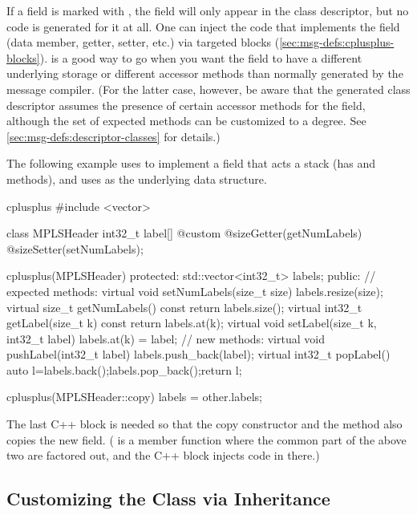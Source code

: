 If a field is marked with , the field will only appear in the
class descriptor, but no code is generated for it at all. One can inject the
code that implements the field (data member, getter, setter, etc.) via targeted
 blocks (\ref{sec:msg-defs:cplusplus-blocks}).
 is a good way to go when you want the field to have a different
underlying storage or different accessor methods than normally generated by the
message compiler. (For the latter case, however, be aware that the generated
class descriptor assumes the presence of certain accessor methods for the
field, although the set of expected methods can be customized to a degree. See
\ref{sec:msg-defs:descriptor-classes} for details.)

The following example uses  to implement a field that acts a
stack (has  and  methods), and uses  as
the underlying data structure.

\begin{msg}
cplusplus {{
#include <vector>
}}

class MPLSHeader
{
    int32_t label[] @custom @sizeGetter(getNumLabels) @sizeSetter(setNumLabels);
}

cplusplus(MPLSHeader) {{
  protected:
    std::vector<int32_t> labels;
  public:
    // expected methods:
    virtual void setNumLabels(size_t size) {labels.resize(size);}
    virtual size_t getNumLabels() const {return labels.size();}
    virtual int32_t getLabel(size_t k) const {return labels.at(k);}
    virtual void setLabel(size_t k, int32_t label) {labels.at(k) = label;}
    // new methods:
    virtual void pushLabel(int32_t label) {labels.push_back(label);}
    virtual int32_t popLabel() {auto l=labels.back();labels.pop_back();return l;}
}}

cplusplus(MPLSHeader::copy) {{
    labels = other.labels;
}}
\end{msg}

The last C++ block is needed so that the copy constructor and the
 method also copies the new field. ( is a member
function where the common part of the above two are factored out, and the C++
block injects code in there.)


\subsection{Customizing the Class via Inheritance}
\label{sec:msg-defs:customizing-via-inheritance}

